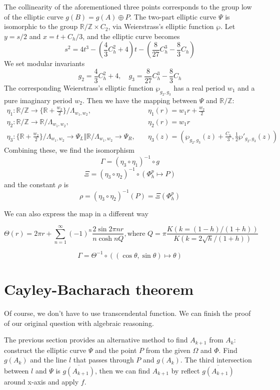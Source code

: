 \documentclass[]{article}
\begin{document}
 The collinearity of the aforementioned three points corresponds to the group low of the elliptic curve $g(B) = g(A) \oplus P$. The two-part elliptic curve $\Psi$ is isomorphic to the group $\mathbb{R}/\mathbb{Z} \times C_2$, via Weierstrass's elliptic function $\wp$. Let $y = s/2$ and $x=t+C_h/3$, and the elliptic curve becomes
 \[
 s^2 = 4t^3-\left(\frac{4}{3}C_h^2+4\right)t-\left(\frac{8}{27}C_h^3-\frac{8}{3}C_h\right)
 \]
 We set modular invariants
 \[
 g_2 = \frac{4}{3}C_h^2+4,\quad g_3 = \frac{8}{27}C_h^3-\frac{8}{3}C_h
 \]
 The corresponding Weierstrass's elliptic function $\wp_{g_2,g_3}$ has a real period $w_1$ and a pure imaginary period $w_2$. Then we have the mapping between $\Psi$ and $\mathbb{R}/\mathbb{Z}$:
\begin{align*}
 \eta_1: \mathbb{R}/\mathbb{Z}\to\{\mathbb{R}+\frac{w_2}{2}\}/\Lambda_{w_1,w_2},& \quad  \eta_1(r) = w_1 r + \frac{w_2}{2}\\
 \eta_2: \mathbb{R}/\mathbb{Z}\to\mathbb{R}/\Lambda_{w_1,w_2},& \quad  \eta_2(r) = w_1 r\\
 \eta_3: \{\mathbb{R}+\frac{w_2}{2}\}/\Lambda_{w_1,w_2}\to\Psi_L\Big\Vert\mathbb{R}/\Lambda_{w_1,w_2}\to\Psi_R,&\quad \eta_3(z) = \left(\wp_{g_2,g_3}(z)+\frac{C_h}{3}, \frac{1}{2}\wp'_{g_2,g_3}(z)\right)
\end{align*}
Combining these, we find the isomorphism  \[
\Gamma = (\eta_3  \circ \eta_1)^{-1} \circ g\]
\[
\Xi = (\eta_3  \circ \eta_2)^{-1} \circ (\Phi_h^p \mapsto P)
\]
and the constant $\rho$ is
\[
\rho =(\eta_3  \circ \eta_2)^{-1}(P) =  \Xi(\Phi_h^p)
\]

We can also express the map in a different way

\[
\Theta(r) = 2\pi r + \sum_{n=1}^\infty (-1)^n\frac{2 \sin 2\pi nr}{n\cosh n Q }, \mbox{where } Q = \pi\frac{K(k=(1-h)/(1+h))}{K(k=2\sqrt{h}/(1+h))}
\]

\[
\Gamma = \Theta^{-1} \circ ((\cos\theta, \sin\theta) \mapsto \theta)
\]
 
\section{Cayley-Bacharach theorem}
 
 Of course, we don't have to use transcendental function. We can finish the proof of our original question with algebraic reasoning. 
 
 The previous section provides an alternative method to find $A_{k+1}$ from $A_k$: construct the elliptic curve $\Psi$ and the point $P$ from the given $\Omega$ and $\Phi$. Find $g(A_k)$ and the line $l$ that passes through $P$ and $g(A_k)$. The third intersection between $l$ and $\Psi$ is $\overline{g(A_{k+1})}$, then we can find $A_{k+1}$ by reflect $\overline{g(A_{k+1})}$ around x-axis and apply $f$.
 
\end{document}
